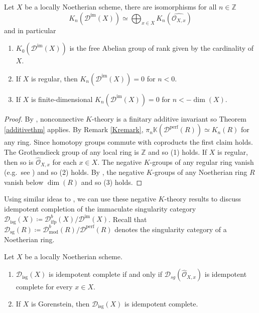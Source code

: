\documentclass[12pt,oneside]{amsart}
\DeclareMathOperator{\fdmod}{mod}
\DeclareMathOperator{\perf}{perf}
\DeclareMathOperator{\immac}{im}
\DeclareMathOperator{\ifp}{ifp}
\DeclareMathOperator{\sg}{sg}
\DeclareMathOperator{\isg}{isg}
\begin{document}
\begin{cor} \label{K-theory}
Let $X$ be a locally Noetherian scheme, there are isomorphisms for all $n \in \mathbb{Z}$
\[
K_n(\mathcal{D}^{\immac}(X)) \simeq \bigoplus_{x \in X} K_n(\widehat{{\mathcal{O}}_{X,x}})
\]
and in particular 
\begin{enumerate}
\item $K_0(\mathcal{D}^{\immac}(X))$ is the free Abelian group of rank given by the cardinality of $X$.
\item If $X$ is regular, then $K_n(\mathcal{D}^{\immac}(X)) = 0$ for $n < 0$.

\item If $X$ is finite-dimensional $K_n(\mathcal{D}^{\immac}(X)) = 0$ for $ n < - \dim(X)$.
\end{enumerate}
\end{cor}

\begin{proof}
By \cite[Theorem 9.8]{BGT13}, nonconnective $K$-theory is a finitary additive invariant so Theorem \ref{additivethm} applies. By Remark \ref{Kremark}, $\pi_n\mathbb{K}(\mathcal{D}^{\perf}(R)) \simeq K_n(R)$ for any ring. Since homotopy groups commute with coproducts the first claim holds. The Grothendieck group of any local ring is $\mathbb{Z}$ and so (1) holds. If $X$ is regular, then so is $\widehat{\mathcal{O}}_{X,x}$ for each $x \in X$. The negative $K$-groups of any regular ring vanish (e.g.\ see \cite[III.4]{Wei13}) and so (2) holds. By \cite[Theorem B]{KST19}, the negative $K$-groups of any Noetherian ring $R$ vanish below $\dim(R)$ and so (3) holds. 
\end{proof}

Using similar ideas to \cite{Orl11}, we can use these negative $K$-theory results to discuss idempotent completion of the immaculate singularity category $\mathcal{D}_{\isg}(X) \coloneq \mathcal{D}^b_{\ifp}(X)/\mathcal{D}^{\immac}(X)$. Recall that $\mathcal{D}_{\sg}(R) \coloneq \mathcal{D}^b_{\fdmod}(R)/ \mathcal{D}^{\perf}(R)$ denotes the singularity category of a Noetherian ring. 

\begin{cor} \label{idempotentcomplete} Let $X$ be a locally Noetherian scheme. 
\begin{enumerate}

\item $\mathcal{D}_{\isg}(X)$ is idempotent complete if and only if $\mathcal{D}_{sg}(\widehat{\mathcal{O}}_{X,x})$ is idempotent complete for every $x \in X$. 

\item If $X$ is Gorenstein, then $\mathcal{D}_{\isg}(X)$ is idempotent complete.
\end{enumerate}
\end{cor}
\end{document}

